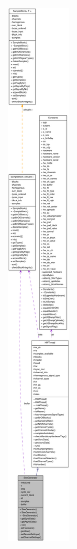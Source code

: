 \begin{figure}[H]
\begin{center}
\leavevmode
\includegraphics[height=400pt]{class_sine_generator__coll__graph}
\end{center}
\end{figure}
